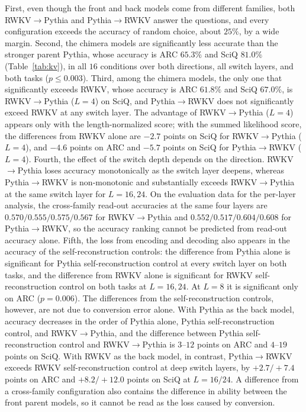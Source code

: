 \documentclass[conference]{IEEEtran}
\newcommand{\tabref}[1]{Table~\ref{#1}}
\newcommand{\RWKVself}{RWKV self-reconstruction control}
\newcommand{\Pythiaself}{Pythia self-reconstruction control}
\newcommand{\RtoP}{RWKV$\to$\allowbreak Pythia}
\newcommand{\PtoR}{Pythia$\to$\allowbreak RWKV}
\newcommand{\RtoPL}[1]{\RtoP{} ($L{=}#1$)}
\newcommand{\PtoRL}[1]{\PtoR{} ($L{=}#1$)}
\begin{document}
First, even though the front and back models come from different families, both \RtoP{} and \PtoR{} answer the questions, and every
configuration exceeds the accuracy of random choice, about $25\%$, by a wide margin.
Second, the chimera models are significantly less accurate than the stronger parent Pythia, whose accuracy is ARC $65.3\%$ and SciQ $81.0\%$
(\tabref{tab:kv}), in all $16$ conditions over both directions, all switch layers, and both tasks ($p\le0.003$).
Third, among the chimera models, the only one that significantly exceeds RWKV, whose accuracy is ARC $61.8\%$ and SciQ $67.0\%$, is \RtoPL{4} on SciQ,
and \PtoR{} does not significantly exceed RWKV at any switch layer.
The advantage of \RtoPL{4} appears only with the length-normalized score; with the summed likelihood score, the differences from RWKV alone are $-2.7$ points
on SciQ for \RtoPL{4}, and $-4.6$ points on ARC and $-5.7$ points on SciQ for \PtoRL{4}.
Fourth, the effect of the switch depth depends on the direction. \RtoP{} loses accuracy monotonically as the switch layer deepens,
whereas \PtoR{} is non-monotonic and substantially exceeds \RtoP{} at the same switch layer for $L{=}16,24$. On the evaluation data for the per-layer
analysis, the cross-family read-out accuracies at the same four layers are
$0.570/0.555/0.575/0.567$ for \RtoP{} and $0.552/0.517/0.604/0.608$ for \PtoR{}, so the accuracy ranking cannot be predicted from
read-out accuracy alone.
Fifth, the loss from encoding and decoding also appears in the accuracy of the self-reconstruction controls: the difference from
Pythia alone is significant for \Pythiaself{} at every switch layer on both tasks, and the difference from RWKV alone is significant for
\RWKVself{} on both tasks at $L{=}16,24$. At $L{=}8$ it is significant only on ARC ($p{=}0.006$). The differences from the
self-reconstruction controls, however, are not due to conversion error alone. With Pythia as the back model, accuracy decreases in
the order of Pythia alone, \Pythiaself{}, and \RtoP{}, and the difference between \Pythiaself{} and \RtoP{} is $3$--$12$ points on ARC
and $4$--$19$ points on SciQ. With RWKV as the back model, in contrast, \PtoR{} exceeds \RWKVself{} at deep switch layers, by
$+2.7/+7.4$ points on ARC and $+8.2/+12.0$ points on SciQ at $L{=}16/24$.
A difference from a cross-family configuration also contains the difference in ability between the front parent models, so it cannot
be read as the loss caused by conversion.
\end{document}
